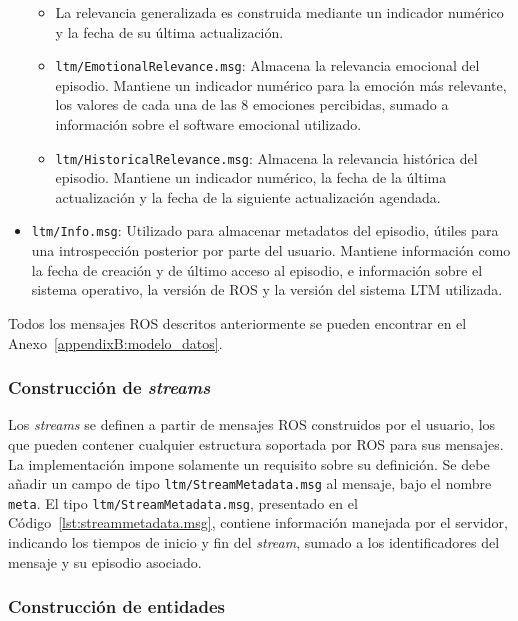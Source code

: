 \begin{itemize}
\begin{itemize}
\item La relevancia generalizada es construida mediante un indicador numérico y la fecha de su última actualización.
\item \texttt{ltm/EmotionalRelevance.msg}: Almacena la relevancia emocional del episodio. Mantiene un indicador numérico para la emoción más relevante, los valores de cada una de las 8 emociones percibidas, sumado a información sobre el software emocional utilizado.
\item \texttt{ltm/HistoricalRelevance.msg}: Almacena la relevancia histórica del episodio. Mantiene un indicador numérico, la fecha de la última actualización y la fecha de la siguiente actualización agendada.
\end{itemize}
\item \texttt{ltm/Info.msg}: Utilizado para almacenar metadatos del episodio, útiles para una introspección posterior por parte del usuario. Mantiene información como la fecha de creación y de último acceso al episodio, e información sobre el sistema operativo, la versión de ROS y la versión del sistema LTM utilizada.
\end{itemize}
 
Todos los mensajes ROS descritos anteriormente se pueden encontrar en el Anexo~\ref{appendixB:modelo_datos}.


\subsubsection{Construcción de \textit{streams}}

Los \textit{streams} se definen a partir de mensajes ROS construidos por el usuario, los que pueden contener cualquier estructura soportada por ROS para sus mensajes. La implementación impone solamente un requisito sobre su definición. Se debe añadir un campo de tipo \texttt{ltm/StreamMetadata.msg} al mensaje, bajo el nombre \texttt{meta}. El tipo \texttt{ltm/StreamMetadata.msg}, presentado en el Código~\ref{lst:streammetadata.msg}, contiene información manejada por el servidor, indicando los tiempos de inicio y fin del \textit{stream}, sumado a los identificadores del mensaje y su episodio asociado.
\lstset{style=/Style/ROS/MSG}



\subsubsection{Construcción de entidades}

